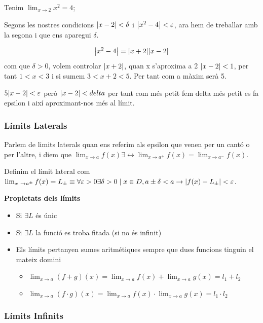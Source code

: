 \documentclass[12pt]{article}
\begin{document}
\begin{examplebox}{}
    Tenim $\lim_{x\rightarrow 2} x^2 = 4$;

    Segons les nostres condicions $\abs{x-2} < \delta$ i $\abs{x^2 - 4} < \varepsilon$, ara hem de treballar amb la segona i que ens aparegui $\delta$.

    \[\abs{x^2 - 4} = \abs{x+2} \abs{x-2}\] com que $\delta > 0$, volem controlar $\abs{x+2}$, quan x s'aproxima a 2 $\abs{x-2} < 1$, per tant $1<x<3$ i si sumem $3<x+2<5$. Per tant com a màxim serà 5.

    $5\abs{x-2}<\varepsilon$ però $\abs{x-2} < delta$ per tant com més petit fem delta més petit es fa epsilon i així aproximant-nos més al límit.
\end{examplebox}

\subsubsection{Límits Laterals}

Parlem de limits laterals quan ens referim als epsilon que venen per un cantó o per l'altre, i diem que $\lim_{x\rightarrow a}f(x) \exists \leftrightarrow \lim_{x\rightarrow a^+}f(x) = \lim_{x\rightarrow a^-}f(x)$. 

Definim el límit lateral com $\lim_{x \rightarrow a^{\pm}}f(x) = L_{\pm} \equiv \forall \varepsilon > 0 \exists \delta >0 \mid x\in D, a\pm \delta < a \rightarrow \abs{f(x) - L_{\pm}} < \varepsilon$. 

\textbf{Propietats dels límits}

\begin{itemize}
    \item Si $\exists L$ és únic
    \item Si $\exists L$ la funció es troba fitada (si no és infinit)
    \item Els límits pertanyen sumes aritmétiques sempre que dues funcions tinguin el mateix domini
    \begin{itemize}
        \item $\lim_{x\rightarrow a} (f+g)(x) = \lim_{x\rightarrow a} f(x)+\lim_{x\rightarrow a} g(x) = l_1 + l_2$
        \item $\lim_{x\rightarrow a} (f\cdot g)(x) = \lim_{x\rightarrow a} f(x)\cdot\lim_{x\rightarrow a} g(x) = l_1 \cdot l_2$
    \end{itemize}
\end{itemize}

\subsubsection{Límits Infinits}
\end{document}
